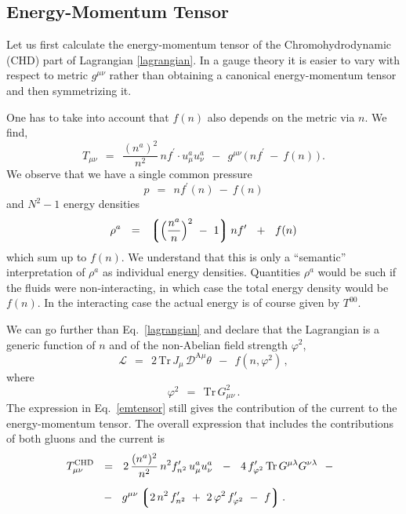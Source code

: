 \documentclass[epsfig,12pt]{article}
\def\beq{\begin{equation}}
\def\eeq{\end{equation}}
\newcommand{\md}{\mathcal{D}}
\newcommand{\ml}{\mathcal{L}}
\newcommand{\lgr}{\left\lgroup}
\newcommand{\rgr}{\right\rgroup}
\newcommand{\Tr}{\text{Tr}}
\begin{document}
\subsection{Energy-Momentum Tensor}
	Let us first calculate the energy-momentum tensor of the Chromohydrodynamic (CHD) part of Lagrangian \eqref{lagrangian}.
	In a gauge theory it is easier to vary with respect to metric $ g^{\mu\nu} $ rather than obtaining
	a canonical energy-momentum tensor and then symmetrizing it.

	One has to take into account that $ f(n) $ also depends on the metric via $ n $.
	We find,
\beq
\label{emtensor}
	T_{\mu\nu}    ~~=~~
				\frac{(n^a)^2}{n^2}\, n f^\prime \cdot u_\mu^a u_\nu^a  ~~-~~
				g^{\mu\nu}\, \big(\, n f^\prime ~-~ f(n) \,\big)\,.
\eeq
	We observe that we have a single common pressure
\beq
	p    ~~=~~    n f^\prime(n) ~-~ f(n)
\eeq
	and $ N^2 - 1 $ energy densities
\beq
	\rho^a    ~~=~~    \lgr \Big( \frac{n^a}{n} \Big)^2 ~-~ 1 \rgr n f^\prime  ~~+~~ f(n)
\eeq
	which sum up to $ f(n) $.
	We understand that this is only a ``semantic'' interpretation of $ \rho^a $ as individual energy densities.
	Quantities $ \rho^a $ would be such if the fluids were non-interacting, in which case
	the total energy density would be $ f(n) $.
	In the interacting case the actual energy is of course given by $ T^{00} $.

        We can go further than Eq.~\eqref{lagrangian} and declare that the Lagrangian
        is a generic function of $ n $ and of the non-Abelian field strength $ \varphi^2 $,
\beq
\label{generic}
        \ml    ~~=~~    2\, \Tr\, J_\mu\,  \md^{\text{A}\mu} \theta   ~~-~~  f(n, \varphi^2)\,,
\eeq
        where
\beq
        \varphi^2    ~~=~~    \Tr\, G_{\mu\nu}^2\,.
\eeq
	The expression in Eq.~\eqref{emtensor} still gives the contribution of the current to the energy-momentum tensor.
	The overall expression that includes the contributions of both gluons and the current is
\begin{align}
\notag
	T_{\mu\nu}^\text{CHD}   & 
			~~=~~
				2\, \frac{(n^a)^2}{n^2}\, n^2 f_{n^2}^\prime\, u_\mu^a u_\nu^a  ~~-~~
				4\, f_{\varphi^2}^\prime\, \Tr\, G^{\mu\lambda} G^{\nu\lambda}  ~~-~~
	\\[2mm]
\label{TCHD}
	& 
			~~-~~
				g^{\mu\nu} \lgr 2\, n^2\, f_{n^2}^\prime  ~+~  2\, \varphi^2\, f_{\varphi^2}^\prime  ~-~  f \rgr .
\end{align}
\end{document}
